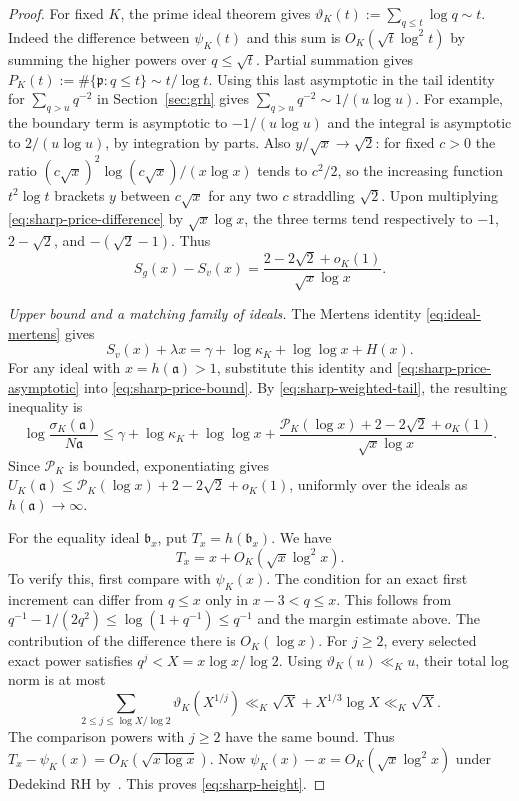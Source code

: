 \documentclass[11pt]{amsart}
\theoremstyle{definition}
\theoremstyle{remark}
\numberwithin{equation}{section}
\begin{document}
\begin{proof}
For fixed \(K\), the prime ideal theorem gives
\(\vartheta_K(t):=\sum_{q\le t}\log q\sim t\).
Indeed the difference between \(\psi_K(t)\) and this
sum is \(O_K(\sqrt t\log^2 t)\) by summing the higher
powers over \(q\le\sqrt t\). Partial summation gives
\(P_K(t):=\#\{\mathfrak p:q\le t\}\sim
t/\log t\).
Using this last asymptotic in the tail identity for
\(\sum_{q>u}q^{-2}\) in Section~\ref{sec:grh} gives
\(\sum_{q>u}q^{-2}\sim 1/(u\log u)\).
For example, the boundary term is asymptotic to
\(-1/(u\log u)\) and the integral is asymptotic to
\(2/(u\log u)\), by integration by parts. Also
\(y/\sqrt{x}\to\sqrt2\): for fixed \(c>0\) the ratio
\((c\sqrt{x})^2\log(c\sqrt{x})/(x\log x)\) tends to
\(c^2/2\), so the increasing function \(t^2\log t\)
brackets \(y\) between \(c\sqrt{x}\) for any two \(c\)
straddling \(\sqrt2\).
Upon multiplying \eqref{eq:sharp-price-difference} by
\(\sqrt{x}\log x\), the three terms tend respectively to
\(-1\), \(2-\sqrt2\), and \(-(\sqrt2-1)\). Thus
\begin{equation}\label{eq:sharp-price-asymptotic}
 S_g(x)-S_v(x)=\frac{2-2\sqrt2+o_K(1)}{\sqrt{x}\log x}.
\end{equation}

\emph{Upper bound and a matching family of ideals.}
The Mertens identity \eqref{eq:ideal-mertens} gives
\[
 S_v(x)+\lambda x=\gamma+\log\kappa_K+\log\log x+H(x).
\]
For any ideal with \(x=h(\mathfrak a)>1\), substitute
this identity and \eqref{eq:sharp-price-asymptotic} into
\eqref{eq:sharp-price-bound}. By \eqref{eq:sharp-weighted-tail},
the resulting inequality is
\[
 \log\frac{\sigma_K(\mathfrak a)}{N\mathfrak a}
 \le \gamma+\log\kappa_K+\log\log x+
 \frac{\mathcal P_K(\log x)+2-2\sqrt2+o_K(1)}{\sqrt{x}\log x}.
\]
Since \(\mathcal P_K\) is bounded, exponentiating gives
\(U_K(\mathfrak a)\le \mathcal P_K(\log x)+2-2\sqrt2+o_K(1)\),
uniformly over the ideals as \(h(\mathfrak a)\to\infty\).

For the equality ideal \(\mathfrak b_x\), put
\(T_x=h(\mathfrak b_x)\).
We have
\begin{equation}\label{eq:sharp-height}
 T_x=x+O_K(\sqrt{x}\log^2 x).
\end{equation}
To verify this, first compare with \(\psi_K(x)\).
The condition for an exact first increment can differ from
\(q\le x\) only in \(x-3<q\le x\). This follows from
\(q^{-1}-1/(2q^2)\le\log(1+q^{-1})\le q^{-1}\)
and the margin estimate above. The contribution of the
difference there is \(O_K(\log x)\). For \(j\ge2\), every
selected exact power satisfies \(q^j<X=x\log x/\log 2\).
Using \(\vartheta_K(u)\ll_K u\), their total log norm
is at most
\[
 \sum_{2\le j\le\log X/\log 2}\vartheta_K(X^{1/j})
 \ll_K \sqrt X + X^{1/3}\log X\ll_K\sqrt X.
\]
The comparison powers with \(j\ge2\) have the same bound.
Thus \(T_x-\psi_K(x)=O_K(\sqrt{x\log x})\).
Now \(\psi_K(x)-x=O_K(\sqrt{x}\log^2 x)\) under
Dedekind RH by~\cite[Corollary~1.2]{GrenieMolteniPIT}.
This proves \eqref{eq:sharp-height}.


\end{proof}
\end{document}

